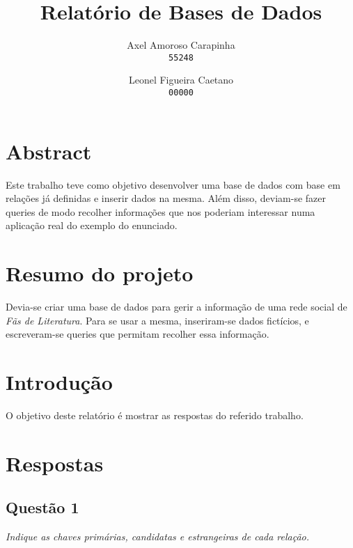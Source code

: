 \documentclass {report}
\title {Relatório de Bases de Dados}
\author{
    Axel Amoroso Carapinha\\
    \texttt{55248}
    \and
    Leonel Figueira Caetano \\
  \texttt{00000}
}
\begin{document}
\date{}
\begin{figure}[t]
	\vspace {-2cm}
	\centering
\end{figure}
\maketitle

\renewcommand{\thesection}{\arabic{section}}
\makeatother

\tableofcontents 
\newpage

\section{Abstract}
	\hspace{1cm}Este trabalho teve como objetivo desenvolver uma base de dados 
    com base em relações já definidas e inserir dados na mesma.
    Além disso, deviam-se fazer queries de modo recolher informações 
    que nos poderiam interessar numa aplicação real do exemplo do enunciado.

\section{Resumo do projeto}
	\hspace{1cm}Devia-se criar uma base de dados para gerir a informação de uma  
    rede social de \textit{Fãs de Literatura}. Para se usar a mesma, 
    inseriram-se dados fictícios, e escreveram-se queries 
    que permitam recolher essa informação.

\section{Introdução}
	O objetivo deste relatório é mostrar as respostas do referido trabalho.

\section{Respostas}
\subsection{Questão 1}
\textit{Indique as chaves primárias, candidatas e estrangeiras de cada relação.}
\end{document}
